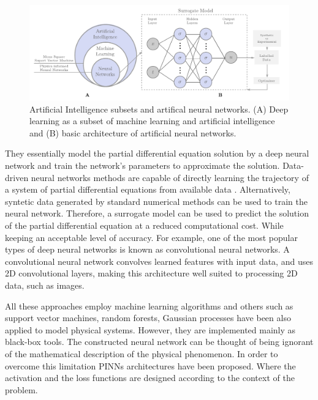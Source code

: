 \documentclass[11pt,twoside]{article}
\begin{document}
\begin{figure}[h]
\centering
    \includegraphics[width=1.0\textwidth]{figs/artificial_intelligence_subsets.pdf}
    \caption{Artificial Intelligence subsets and artifical neural networks. (A) Deep learning as a subset of machine 
    learning and artificial intelligence and (B) basic architecture of artificial neural networks.}    
    \label{deep_learning_subset_architecture}
\end{figure}

They essentially model the partial differential equation solution by a deep neural network and train the 
network’s parameters to approximate the solution. Data-driven neural networks methods are capable of directly 
learning the trajectory of a system of partial differential equations from available data 
\citep{li_neural_2020,li_fourier_2021}. Alternatively, syntetic data generated by standard numerical 
methods can be used to train the neural network. Therefore, a surrogate model can be used to predict the
solution of the partial differential equation at a reduced computational cost. While keeping an acceptable
level of accuracy.  For example, one of the most popular types of deep neural networks is known as 
convolutional neural networks. A convolutional neural network convolves learned features with input data, 
and uses 2D convolutional layers, making this architecture well suited to processing 2D data, such as images.

All these approaches employ machine learning algorithms and others such as support vector machines, 
random forests, Gaussian processes have been also applied to model physical systems. However, they 
are implemented mainly as black-box tools. The constructed neural network can be thought of being 
ignorant of the mathematical description of the physical phenomenon. In order to overcome this 
limitation PINNs architectures have been proposed. Where the activation 
and the loss functions are designed according to the context of the problem.
\end{document}
